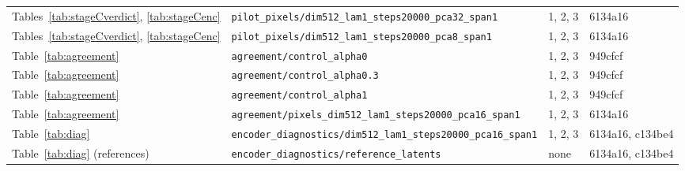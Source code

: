 \begin{longtable}{p{3.6cm}p{6.2cm}p{1.6cm}p{1.6cm}}
Tables~\ref{tab:stageCverdict}, \ref{tab:stageCenc} & \texttt{pilot\_\allowbreak pixels/\allowbreak dim512\_\allowbreak lam1\_\allowbreak steps20000\_\allowbreak pca32\_\allowbreak span1} & 1, 2, 3 & 6134a16\\
Tables~\ref{tab:stageCverdict}, \ref{tab:stageCenc} & \texttt{pilot\_\allowbreak pixels/\allowbreak dim512\_\allowbreak lam1\_\allowbreak steps20000\_\allowbreak pca8\_\allowbreak span1} & 1, 2, 3 & 6134a16\\
Table~\ref{tab:agreement} & \texttt{agreement/\allowbreak control\_\allowbreak alpha0} & 1, 2, 3 & 949cfcf\\
Table~\ref{tab:agreement} & \texttt{agreement/\allowbreak control\_\allowbreak alpha0.3} & 1, 2, 3 & 949cfcf\\
Table~\ref{tab:agreement} & \texttt{agreement/\allowbreak control\_\allowbreak alpha1} & 1, 2, 3 & 949cfcf\\
Table~\ref{tab:agreement} & \texttt{agreement/\allowbreak pixels\_\allowbreak dim512\_\allowbreak lam1\_\allowbreak steps20000\_\allowbreak pca16\_\allowbreak span1} & 1, 2, 3 & 6134a16\\
Table~\ref{tab:diag} & \texttt{encoder\_\allowbreak diagnostics/\allowbreak dim512\_\allowbreak lam1\_\allowbreak steps20000\_\allowbreak pca16\_\allowbreak span1} & 1, 2, 3 & 6134a16, \allowbreak c134be4\\
Table~\ref{tab:diag} (references) & \texttt{encoder\_\allowbreak diagnostics/\allowbreak reference\_\allowbreak latents} & none & 6134a16, \allowbreak c134be4\\
\bottomrule\end{longtable}
